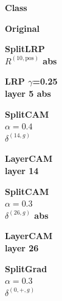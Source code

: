 \newcommand{\colA}{0.10}
\newcommand{\colB}{0.075}
\newcommand{\colSpace}{0.0015\linewidth}

\begin{figure}[!t]
    \centering

    \begin{minipage}[c]{\colA\linewidth}\centering\scriptsize\textbf{Class}\end{minipage}\hspace{\colSpace}%
    \begin{minipage}[c]{\colB\linewidth}\centering\scriptsize\textbf{Original}\end{minipage}\hspace{\colSpace}%
    \begin{minipage}[c]{\colB\linewidth}\centering\scriptsize\textbf{SplitLRP}\\\scriptsize\textbf{$R^{(10,\text{pos})}$ abs}\end{minipage}\hspace{\colSpace}%
    \begin{minipage}[c]{\colB\linewidth}\centering\scriptsize\textbf{LRP $\gamma$=0.25}\\\scriptsize\textbf{layer 5 abs}\end{minipage}\hspace{\colSpace}%
    \begin{minipage}[c]{\colB\linewidth}\centering\scriptsize\textbf{SplitCAM}\\\scriptsize\textbf{$\alpha=0.4$}\\\scriptsize\textbf{$\delta^{(14,g)}$}\end{minipage}\hspace{\colSpace}%
    \begin{minipage}[c]{\colB\linewidth}\centering\scriptsize\textbf{LayerCAM}\\\scriptsize\textbf{layer 14}\end{minipage}\hspace{\colSpace}%
    \begin{minipage}[c]{\colB\linewidth}\centering\scriptsize\textbf{SplitCAM}\\\scriptsize\textbf{$\alpha=0.3$}\\\scriptsize\textbf{$\delta^{(26,g)}$ abs}\end{minipage}\hspace{\colSpace}%
    \begin{minipage}[c]{\colB\linewidth}\centering\scriptsize\textbf{LayerCAM}\\\scriptsize\textbf{layer 26}\end{minipage}\hspace{\colSpace}%
    \begin{minipage}[c]{\colB\linewidth}\centering\scriptsize\textbf{SplitGrad}\\\scriptsize\textbf{$\alpha=0.3$}\\\scriptsize\textbf{$\delta^{(0,+,g)}$}\end{minipage}


\end{figure}
